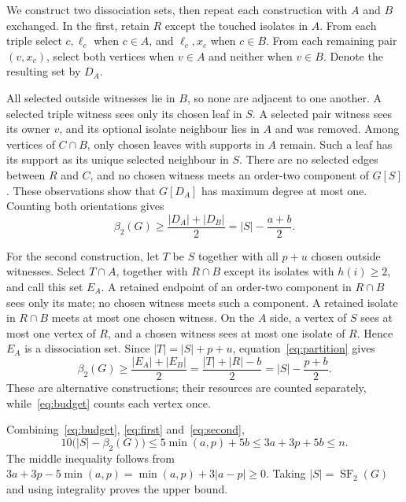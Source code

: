 \documentclass[11pt]{article}
\newcommand{\SF}{\operatorname{SF}_2}
\newcommand{\diss}{\beta_2}
\begin{document}
We construct two dissociation sets, then repeat each construction with
$A$ and $B$ exchanged. In the first, retain $R$ except the touched
isolates in $A$. From each triple select $c,\ell_c$ when $c\in A$,
and $\ell_c,x_c$ when $c\in B$. From each remaining pair $(v,x_v)$,
select both vertices when $v\in A$ and neither when $v\in B$.
Denote the resulting set by $D_A$.

All selected outside witnesses lie in $B$, so none are adjacent to one
another. A selected triple witness sees only its chosen leaf in $S$.
A selected pair witness sees its owner $v$, and its optional isolate
neighbour lies in $A$ and was removed. Among vertices of $C\cap B$,
only chosen leaves with supports in $A$ remain. Such a leaf has its support
as its unique selected neighbour in $S$. There are no selected edges
between $R$ and $C$, and no chosen witness meets an order-two component
of $G[S]$. These observations show that $G[D_A]$ has maximum degree at most one.
Counting both orientations gives
\begin{equation}\label{eq:first}
 \diss(G)\ge\frac{|D_A|+|D_B|}{2}=|S|-\frac{a+b}{2}.
\end{equation}

For the second construction, let $T$ be $S$ together with all $p+u$
chosen outside witnesses. Select $T\cap A$, together with $R\cap B$
except its isolates with $h(i)\ge2$, and call this set $E_A$.
A retained endpoint of an order-two component in $R\cap B$ sees only
its mate; no chosen witness meets such a component. A retained isolate
in $R\cap B$ meets at most one chosen witness. On the $A$ side, a vertex
of $S$ sees at most one vertex of $R$, and a chosen witness sees at most
one isolate of $R$. Hence $E_A$ is a dissociation set. Since
$|T|=|S|+p+u$, equation~\eqref{eq:partition} gives
\begin{equation}\label{eq:second}
 \diss(G)\ge\frac{|E_A|+|E_B|}{2}
 =\frac{|T|+|R|-b}{2}=|S|-\frac{p+b}{2}.
\end{equation}
These are alternative constructions; their resources are counted
separately, while~\eqref{eq:budget} counts each vertex once.

Combining~\eqref{eq:budget}, \eqref{eq:first} and~\eqref{eq:second},
\begin{equation}\label{eq:chain}
 10\bigl(|S|-\diss(G)\bigr)
 \le5\min(a,p)+5b\le3a+3p+5b\le n.
\end{equation}
The middle inequality follows from
$3a+3p-5\min(a,p)=\min(a,p)+3|a-p|\ge0$.
Taking $|S|=\SF(G)$ and using integrality proves the upper bound.
\end{document}
